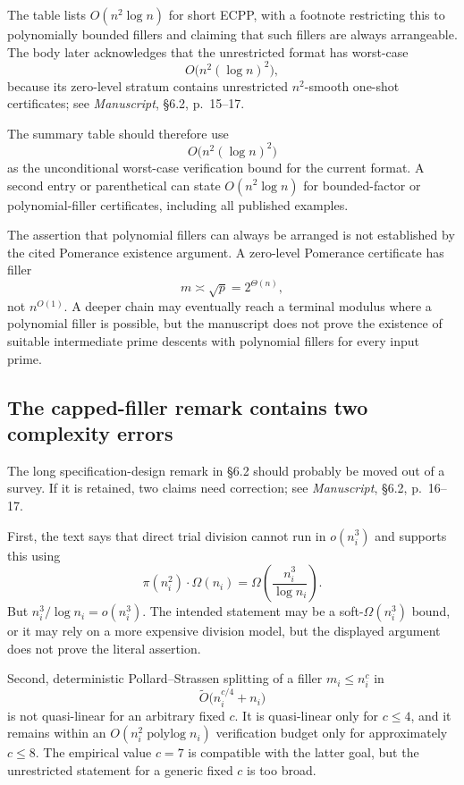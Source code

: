 \documentclass[11pt]{amsart}
\newcommand{\Ot}{\widetilde O}
\newcommand{\sourceat}[2]{\emph{Manuscript}, \S#1, p.~#2}
\begin{document}
The table lists $O(n^2\log n)$ for short ECPP, with a footnote restricting this to polynomially bounded fillers and claiming that such fillers are always arrangeable.  The body later acknowledges that the unrestricted format has worst-case
\[
 O\bigl(n^2(\log n)^2\bigr),
\]
because its zero-level stratum contains unrestricted $n^2$-smooth one-shot certificates; see \sourceat{6.2}{15--17}.

The summary table should therefore use
\[
 \boxed{O\bigl(n^2(\log n)^2\bigr)}
\]
as the unconditional worst-case verification bound for the current format.  A second entry or parenthetical can state $O(n^2\log n)$ for bounded-factor or polynomial-filler certificates, including all published examples.

The assertion that polynomial fillers can always be arranged is not established by the cited Pomerance existence argument.  A zero-level Pomerance certificate has filler
\[
 m\asymp\sqrt p=2^{\Theta(n)},
\]
not $n^{O(1)}$.  A deeper chain may eventually reach a terminal modulus where a polynomial filler is possible, but the manuscript does not prove the existence of suitable intermediate prime descents with polynomial fillers for every input prime.

\subsection{The capped-filler remark contains two complexity errors}

The long specification-design remark in \S6.2 should probably be moved out of a survey.  If it is retained, two claims need correction; see \sourceat{6.2}{16--17}.

First, the text says that direct trial division cannot run in $o(n_i^3)$ and supports this using
\[
 \pi(n_i^2)\cdot\Omega(n_i)
 =\Omega\!\left(\frac{n_i^3}{\log n_i}\right).
\]
But $n_i^3/\log n_i=o(n_i^3)$.  The intended statement may be a soft-$\Omega(n_i^3)$ bound, or it may rely on a more expensive division model, but the displayed argument does not prove the literal assertion.

Second, deterministic Pollard--Strassen splitting of a filler $m_i\le n_i^c$ in
\[
 \Ot\bigl(n_i^{c/4}+n_i\bigr)
\]
is not quasi-linear for an arbitrary fixed $c$.  It is quasi-linear only for $c\le4$, and it remains within an $O(n_i^2\operatorname{polylog}n_i)$ verification budget only for approximately $c\le8$.  The empirical value $c=7$ is compatible with the latter goal, but the unrestricted statement for a generic fixed $c$ is too broad.
\end{document}
